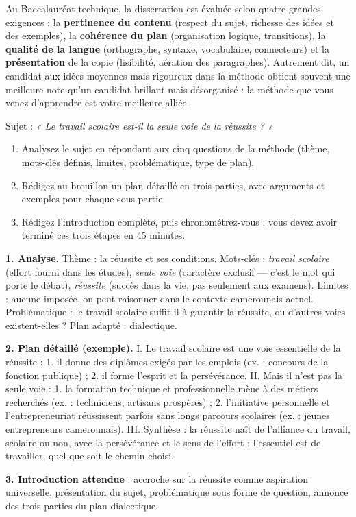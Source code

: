 \documentclass[11pt]{article}
\newcommand{\cle}[1]{{\popxbold\color{popdark}#1}}
\begin{document}
\begin{savaistu}
Au \cle{Baccalauréat technique}, la dissertation est évaluée selon quatre grandes exigences : la \textbf{pertinence du contenu} (respect du sujet, richesse des idées et des exemples), la \textbf{cohérence du plan} (organisation logique, transitions), la \textbf{qualité de la langue} (orthographe, syntaxe, vocabulaire, connecteurs) et la \textbf{présentation} de la copie (lisibilité, aération des paragraphes). Autrement dit, un candidat aux idées moyennes mais rigoureux dans la méthode obtient souvent une meilleure note qu'un candidat brillant mais désorganisé : la méthode que vous venez d'apprendre est votre meilleure alliée.
\end{savaistu}

\begin{exercice}
Sujet : \emph{« Le travail scolaire est-il la seule voie de la réussite ? »}
\begin{enumerate}
\item Analysez le sujet en répondant aux cinq questions de la méthode (thème, mots-clés définis, limites, problématique, type de plan).
\item Rédigez au brouillon un plan détaillé en trois parties, avec arguments et exemples pour chaque sous-partie.
\item Rédigez l'introduction complète, puis chronométrez-vous : vous devez avoir terminé ces trois étapes en 45 minutes.
\end{enumerate}
\end{exercice}

\begin{corrige}
\textbf{1. Analyse.} Thème : la réussite et ses conditions. Mots-clés : \emph{travail scolaire} (effort fourni dans les études), \emph{seule voie} (caractère exclusif — c'est le mot qui porte le débat), \emph{réussite} (succès dans la vie, pas seulement aux examens). Limites : aucune imposée, on peut raisonner dans le contexte camerounais actuel. Problématique : le travail scolaire suffit-il à garantir la réussite, ou d'autres voies existent-elles ? Plan adapté : dialectique.\par
\textbf{2. Plan détaillé (exemple).} I. Le travail scolaire est une voie essentielle de la réussite : 1. il donne des diplômes exigés par les emplois (ex. : concours de la fonction publique) ; 2. il forme l'esprit et la persévérance. II. Mais il n'est pas la seule voie : 1. la formation technique et professionnelle mène à des métiers recherchés (ex. : techniciens, artisans prospères) ; 2. l'initiative personnelle et l'entrepreneuriat réussissent parfois sans longs parcours scolaires (ex. : jeunes entrepreneurs camerounais). III. Synthèse : la réussite naît de l'alliance du travail, scolaire ou non, avec la persévérance et le sens de l'effort ; l'essentiel est de travailler, quel que soit le chemin choisi.\par
\textbf{3. Introduction attendue} : accroche sur la réussite comme aspiration universelle, présentation du sujet, problématique sous forme de question, annonce des trois parties du plan dialectique.
\end{corrige}
\end{document}
